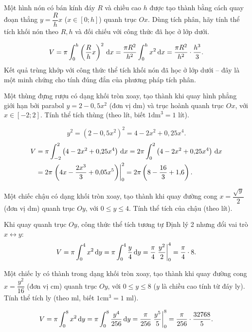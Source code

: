 \begin{hopvidu}
Một hình nón có bán kính đáy $R$ và chiều cao $h$ được tạo thành bằng cách quay đoạn thẳng $y=\dfrac{R}{h}x$ ($x\in[0;h]$) quanh trục $Ox$. Dùng tích phân, hãy tính thể tích khối nón theo $R,h$ và đối chiếu với công thức đã học ở lớp dưới.
\end{hopvidu}
\begin{loigiai}
\[
V=\pi\int_0^h\left(\frac{R}{h}x\right)^2\,\mathrm{d}x = \frac{\pi R^2}{h^2}\int_0^h x^2\,\mathrm{d}x = \frac{\pi R^2}{h^2}\cdot\frac{h^3}{3}.
\]
Kết quả trùng khớp với công thức thể tích khối nón đã học ở lớp dưới -- đây là một minh chứng cho tính đúng đắn của phương pháp tích phân.
\end{loigiai}

\begin{hopvidu}
Một thùng đựng rượu có dạng khối tròn xoay, tạo thành khi quay hình phẳng giới hạn bởi parabol $y=2-0{,}5x^2$ (đơn vị dm) và trục hoành quanh trục $Ox$, với $x\in[-2;2]$. Tính thể tích thùng (theo lít, biết $1\text{dm}^3=1$ lít).
\end{hopvidu}
\begin{loigiai}
\[
y^2=(2-0{,}5x^2)^2 = 4-2x^2+0{,}25x^4.
\]
\begin{align*}
V&=\pi\int_{-2}^{2}\left(4-2x^2+0{,}25x^4\right)\,\mathrm{d}x = 2\pi\int_0^2\left(4-2x^2+0{,}25x^4\right)\,\mathrm{d}x \\
 &= 2\pi\left.\left(4x-\frac{2x^3}{3}+0{,}05x^5\right)\right|_0^2 = 2\pi\left(8-\frac{16}{3}+1{,}6\right).
\end{align*}
\end{loigiai}

\begin{hopvidu}
Một chiếc chậu có dạng khối tròn xoay, tạo thành khi quay đường cong $x=\dfrac{\sqrt{y}}{2}$ (đơn vị dm) quanh trục $Oy$, với $0\le y\le 4$. Tính thể tích của chậu (theo lít).
\end{hopvidu}
\begin{loigiai}
Khi quay quanh trục $Oy$, công thức thể tích tương tự Định lý 2 nhưng đổi vai trò $x\leftrightarrow y$:
\[
V=\pi\int_0^4 x^2\,\mathrm{d}y = \pi\int_0^4 \frac{y}{4}\,\mathrm{d}y = \frac{\pi}{4}\left.\frac{y^2}{2}\right|_0^4 = \frac{\pi}{4}\cdot8.
\]
\end{loigiai}

\begin{hopvidu}
Một chiếc ly có thành trong dạng khối tròn xoay, tạo thành khi quay đường cong $x=\dfrac{y^2}{16}$ (đơn vị cm) quanh trục $Oy$, với $0\le y\le8$ ($y$ là chiều cao tính từ đáy ly). Tính thể tích ly (theo ml, biết $1\text{cm}^3=1$ ml).
\end{hopvidu}
\begin{loigiai}
\[
V=\pi\int_0^8 x^2\,\mathrm{d}y = \pi\int_0^8 \frac{y^4}{256}\,\mathrm{d}y = \frac{\pi}{256}\left.\frac{y^5}{5}\right|_0^8 = \frac{\pi}{256}\cdot\frac{32768}{5}.
\]
\end{loigiai}

